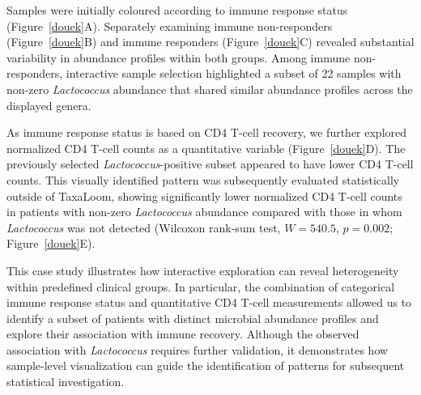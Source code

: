 \documentclass[pdflatex,sn-vancouver-num]{sn-jnl}%
\theoremstyle{thmstyleone}%
\theoremstyle{thmstyletwo}%
\theoremstyle{thmstylethree}%
\begin{document}
Samples were initially coloured according to immune response status (Figure~\ref{douek}A). Separately examining immune non-responders (Figure~\ref{douek}B) and immune responders (Figure~\ref{douek}C) revealed substantial variability in abundance profiles within both groups. Among immune non-responders, interactive sample selection highlighted a subset of 22 samples with non-zero \textit{Lactococcus} abundance that shared similar abundance profiles across the displayed genera.

As immune response status is based on CD4 T-cell recovery, we further explored normalized CD4 T-cell counts as a quantitative variable (Figure~\ref{douek}D). The previously selected \textit{Lactococcus}-positive subset appeared to have lower CD4 T-cell counts. This visually identified pattern was subsequently evaluated statistically outside of TaxaLoom, showing significantly lower normalized CD4 T-cell counts in patients with non-zero \textit{Lactococcus} abundance compared with those in whom \textit{Lactococcus} was not detected (Wilcoxon rank-sum test, $W = 540.5$, $p = 0.002$; Figure~\ref{douek}E).


This case study illustrates how interactive exploration can reveal heterogeneity within predefined clinical groups. In particular, the combination of categorical immune response status and quantitative CD4 T-cell measurements allowed us to identify a subset of patients with distinct microbial abundance profiles and explore their association with immune recovery. Although the observed association with \textit{Lactococcus} requires further validation, it demonstrates how sample-level visualization can guide the identification of patterns for subsequent statistical investigation. 
\end{document}
